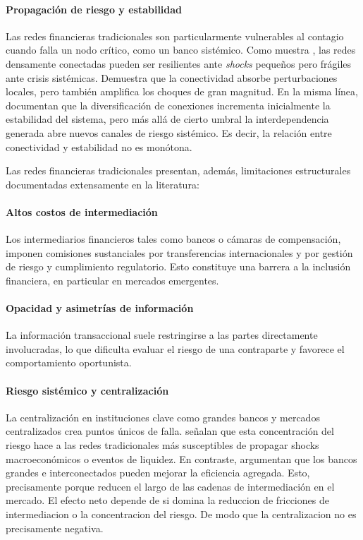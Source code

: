 \paragraph{Propagación de riesgo y estabilidad}

Las redes financieras tradicionales son particularmente vulnerables al contagio
cuando falla un nodo crítico, como un banco sistémico. Como muestra , las redes densamente conectadas pueden ser resilientes ante \textit{shocks} pequeños pero frágiles ante crisis sistémicas. Demuestra que la conectividad absorbe perturbaciones locales, pero también amplifica los choques de gran magnitud. En la misma línea,  documentan que la diversificación de conexiones
incrementa inicialmente la estabilidad del sistema, pero más allá de cierto
umbral la interdependencia generada abre nuevos canales de riesgo sistémico. Es
decir, la relación entre conectividad y estabilidad no es monótona.

Las redes financieras tradicionales presentan, además, limitaciones estructurales
documentadas extensamente en la literatura:

\paragraph{Altos costos de intermediación}
Los intermediarios financieros tales como bancos o cámaras de compensación, imponen
comisiones sustanciales por transferencias internacionales y por gestión de
riesgo y cumplimiento regulatorio. Esto constituye una barrera a la
inclusión financiera, en particular en mercados emergentes.

\paragraph{Opacidad y asimetrías de información}
La información transaccional suele restringirse a las partes directamente
involucradas, lo que dificulta evaluar el riesgo de una contraparte y favorece
el comportamiento oportunista.

\paragraph{Riesgo sistémico y centralización}
La centralización en instituciones clave como grandes bancos y mercados
centralizados crea puntos únicos de falla. 
señalan que esta concentración del riesgo hace a las redes tradicionales más
susceptibles de propagar shocks macroeconómicos o eventos de liquidez. En
contraste,  argumentan que los bancos grandes e
interconectados pueden mejorar la eficiencia agregada. Esto, precisamente porque
reducen el largo de las cadenas de intermediación en el mercado. El efecto neto depende de si domina la reduccion de fricciones de intermediacion o la concentracion del riesgo. De modo que la centralizacion no es precisamente negativa.

